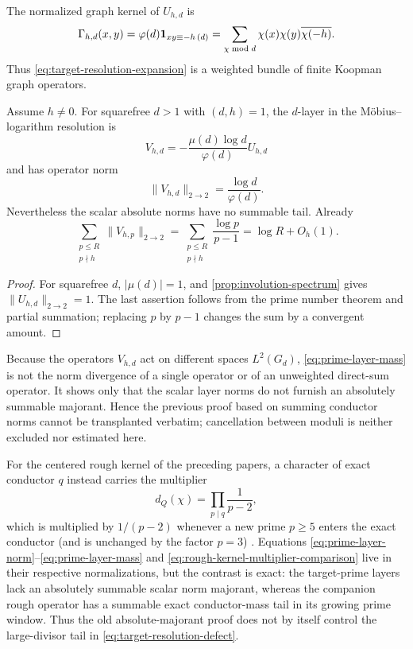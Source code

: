 The normalized graph kernel of $U_{h,d}$ is
\begin{equation}\label{eq:graph-kernel}
 \Gamma_{h,d}(x,y)=\varphi(d)\mathbf 1_{xy\equiv-h\, (d)}
 =\sum_{\chi\bmod d}\chi(x)\chi(y)\overline{\chi(-h)}.
\end{equation}
Thus \eqref{eq:target-resolution-expansion} is a weighted bundle of finite
Koopman graph operators.

\begin{corollary}\label{cor:no-layer-damping}
Assume $h\ne0$.  For squarefree $d>1$ with $(d,h)=1$, the $d$-layer in the
M\"obius--logarithm resolution is
\[
 V_{h,d}=-\frac{\mu(d)\log d}{\varphi(d)}U_{h,d}
\]
and has operator norm
\begin{equation}\label{eq:prime-layer-norm}
 \|V_{h,d}\|_{2\to2}=\frac{\log d}{\varphi(d)}.
\end{equation}
Nevertheless the scalar absolute norms have no summable tail.  Already
\begin{equation}\label{eq:prime-layer-mass}
 \sum_{\substack{p\le R\\p\nmid h}}\|V_{h,p}\|_{2\to2}
 =\sum_{\substack{p\le R\\p\nmid h}}\frac{\log p}{p-1}
 =\log R+O_h(1).
\end{equation}
\end{corollary}

\begin{proof}
For squarefree $d$, $|\mu(d)|=1$, and
\cref{prop:involution-spectrum} gives $\|U_{h,d}\|_{2\to2}=1$.
The last assertion follows from the prime number theorem and partial
summation; replacing $p$ by $p-1$ changes the sum by a convergent amount.
\end{proof}

Because the operators $V_{h,d}$ act on different spaces $L^2(G_d)$,
\eqref{eq:prime-layer-mass} is not the norm divergence of a single operator
or of an unweighted direct-sum operator.  It shows only that the scalar layer
norms do not furnish an absolutely summable majorant.  Hence the previous
proof based on summing conductor norms cannot be transplanted verbatim;
cancellation between moduli is neither excluded nor estimated here.

For the centered rough kernel of the preceding papers, a character of exact
conductor $q$ instead carries the multiplier
\begin{equation}\label{eq:rough-kernel-multiplier-comparison}
 d_Q(\chi)=\prod_{p\mid q}\frac1{p-2},
\end{equation}
which is multiplied by $1/(p-2)$ whenever a new prime $p\geq5$ enters the
exact conductor (and is unchanged by the factor $p=3$)
\citep{WangTPCThree2026,WangTPCFour2026}.
Equations \eqref{eq:prime-layer-norm}--\eqref{eq:prime-layer-mass} and
\eqref{eq:rough-kernel-multiplier-comparison} live in their respective
normalizations, but the contrast is exact: the target-prime layers lack an
absolutely summable scalar norm majorant, whereas the companion rough
operator has a summable exact conductor-mass tail in its growing prime
window.  Thus the old absolute-majorant proof does not by itself control the
large-divisor tail in \eqref{eq:target-resolution-defect}.
